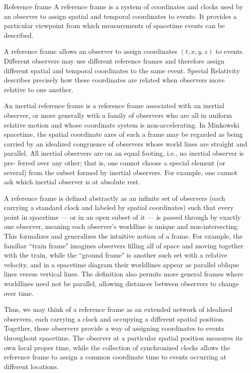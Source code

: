 		\begin{definition}{Reference frame}
			A reference frame is a system of coordinates and clocks used by
			an observer to assign spatial and temporal coordinates to events.
			It provides a particular viewpoint from which measurements of
			spacetime events can be described.
		\end{definition}

		A reference frame allows an observer to assign coordinates
		$(t,x,y,z)$ to events. Different observers may use different
		reference frames and therefore assign different spatial and
		temporal coordinates to the same event. Special Relativity
		describes precisely how these coordinates are related when
		observers move relative to one another.

		An inertial reference frame is a reference frame associated with
		an inertial observer, or more generally with a family of observers
		who are all in uniform relative motion and whose coordinate
		system is non-accelerating. In Minkowski spacetime, the spatial
		coordinate axes of such a frame may be regarded as being carried
		by an idealized congruence of observers whose world lines are
		straight and parallel.
		All inertial observers are on an equal footing, i.e., no inertial observer is pre-
		ferred over any other; that is, one cannot choose a special element (or several) from
		the subset formed by inertial observers. For example, one cannot ask which inertial
		observer is at absolute rest.	

		A reference frame is defined abstractly as an infinite set 
		of observers (each carrying a standard clock and labeled by spatial 
		coordinates) such that every point in spacetime — or in an open subset
		of it — is passed through by exactly one observer, meaning each observer's 
		worldline is unique and non-intersecting. This formalizes and generalizes
		the intuitive notion of a frame. For example, the familiar ``train frame" imagines 
		observers filling all of space and moving together with the train, while 
		the ``ground frame" is another such set with a relative velocity, and in 
		a spacetime diagram their worldlines appear as parallel oblique 
		lines versus vertical lines. The definition also permits more general 
		frames where worldlines need not be parallel, allowing distances between 
		observers to change over time.

		Thus, we may think of a reference frame as an extended network
		of idealized observers, each carrying a clock and occupying a
		different spatial position. Together, these observers provide a
		way of assigning coordinates to events throughout spacetime.
		The observer at a particular spatial position measures its own
		local proper time, while the collection of synchronized clocks
		allows the reference frame to assign a common coordinate time to
		events occurring at different locations.

